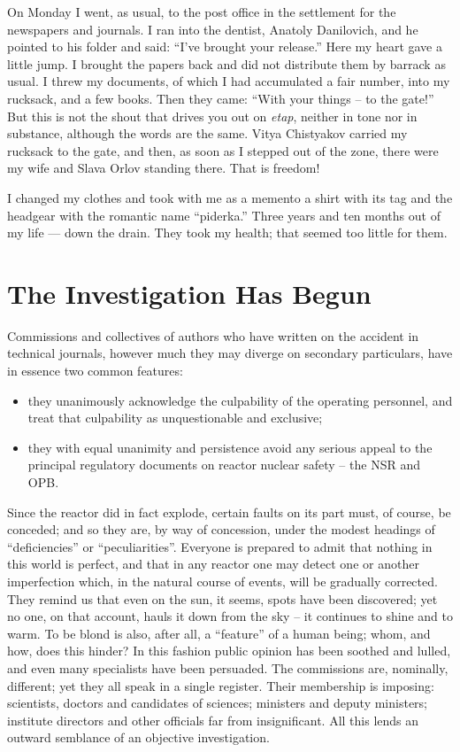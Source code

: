 \documentclass[openright]{bookest}
\begin{document}
On Monday I went, as usual, to the post office in the settlement for the newspapers and journals. I ran into the dentist, Anatoly Danilovich, and he pointed to his folder and said: ``I've brought your release.'' Here my heart gave a little jump. I brought the papers back and did not distribute them by barrack as usual. I threw my documents, of which I had accumulated a fair number, into my rucksack, and a few books. Then they came: ``With your things -- to the gate!'' But this is not the shout that drives you out on \textit{etap}, neither in tone nor in substance, although the words are the same. Vitya Chistyakov carried my rucksack to the gate, and then, as soon as I stepped out of the zone, there were my wife and Slava Orlov standing there. That is freedom!

I changed my clothes and took with me as a memento a shirt with its tag and the headgear with the romantic name ``piderka.'' Three years and ten months out of my life --- down the drain. They took my health; that seemed too little for them.

\chapter{The Investigation Has Begun}

Commissions and collectives of authors who have written on the accident in technical journals, however much they may diverge on secondary particulars, have in essence two common features:

\begin{itemize}
\item they unanimously acknowledge the culpability of the operating personnel, and treat that culpability as unquestionable and exclusive;
\item they with equal unanimity and persistence avoid any serious appeal to the principal regulatory documents on reactor nuclear safety -- the NSR and OPB.
\end{itemize}

Since the reactor did in fact explode, certain faults on its part must, of course, be conceded; and so they are, by way of concession, under the modest headings of ``deficiencies'' or ``peculiarities''. Everyone is prepared to admit that nothing in this world is perfect, and that in any reactor one may detect one or another imperfection which, in the natural course of events, will be gradually corrected. They remind us that even on the sun, it seems, spots have been discovered; yet no one, on that account, hauls it down from the sky -- it continues to shine and to warm. To be blond is also, after all, a ``feature'' of a human being; whom, and how, does this hinder? In this fashion public opinion has been soothed and lulled, and even many specialists have been persuaded. The commissions are, nominally, different; yet they all speak in a single register. Their membership is imposing: scientists, doctors and candidates of sciences; ministers and deputy ministers; institute directors and other officials far from insignificant. All this lends an outward semblance of an objective investigation.
\end{document}
